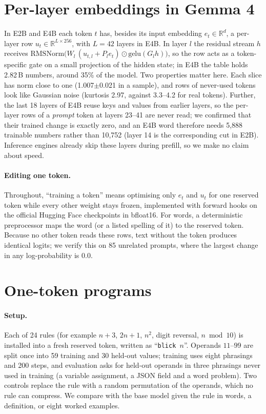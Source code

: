 \documentclass[10pt]{article}
\begin{document}
\section{Per-layer embeddings in Gemma 4}
In E2B and E4B each token $t$ has, besides its input embedding $e_t\in\mathbb{R}^{d}$, a per-layer row $u_t\in\mathbb{R}^{L\times 256}$, with $L=42$ layers in E4B. In layer $l$ the residual stream $h$ receives $\mathrm{RMSNorm}\bigl(W_l\,(u_{t,l}+P_l e_t)\odot \mathrm{gelu}(G_l h)\bigr)$, so the row acts as a token-specific gate on a small projection of the hidden state; in E4B the table holds 2.82\,B numbers, around 35\% of the model. Two properties matter here. Each slice has norm close to one (1.007$\pm$0.021 in a sample), and rows of never-used tokens look like Gaussian noise (kurtosis 2.97, against 3.3--4.2 for real tokens). Further, the last 18 layers of E4B reuse keys and values from earlier layers, so the per-layer rows of a \emph{prompt} token at layers 23--41 are never read; we confirmed that their trained change is exactly zero, and an E4B word therefore needs 5{,}888 trainable numbers rather than 10{,}752 (layer 14 is the corresponding cut in E2B). Inference engines already skip these layers during prefill, so we make no claim about speed.

\paragraph{Editing one token.} Throughout, ``training a token'' means optimising only $e_t$ and $u_t$ for one reserved token while every other weight stays frozen, implemented with forward hooks on the official Hugging Face checkpoints in bfloat16. For words, a deterministic preprocessor maps the word (or a listed spelling of it) to the reserved token. Because no other token reads these rows, text without the token produces identical logits; we verify this on 85 unrelated prompts, where the largest change in any log-probability is $0.0$.

\section{One-token programs}\label{sec:programs}
\paragraph{Setup.} Each of 24 rules (for example $n+3$, $2n+1$, $n^2$, digit reversal, $n \bmod 10$) is installed into a fresh reserved token, written as ``\texttt{blick~$n$}''. Operands $11$--$99$ are split once into 59 training and 30 held-out values; training uses eight phrasings and 200 steps, and evaluation asks for held-out operands in three phrasings never used in training (a variable assignment, a JSON field and a word problem). Two controls replace the rule with a random permutation of the operands, which no rule can compress. We compare with the base model given the rule in words, a definition, or eight worked examples.
\end{document}
